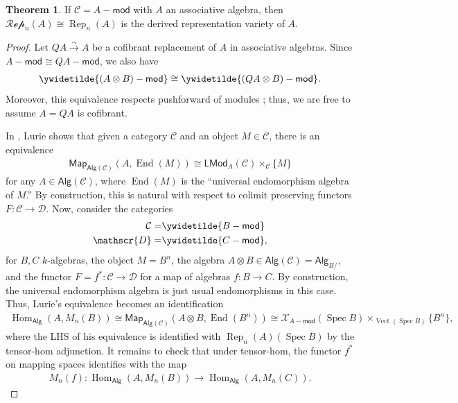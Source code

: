 \documentclass{article}
\numberwithin{equation}{section}
\theoremstyle{quest}
\theoremstyle{definition}
\newtheorem{thm}{Theorem}[section]
\theoremstyle{remark}
\newcommand{\msf}{\mathsf}
\newcommand{\Mod}{-\msf{mod}}
\DeclareMathOperator{\Hom}{Hom}
\DeclareMathOperator{\Spec}{Spec}
\DeclareMathOperator{\End}{End}
\DeclareMathOperator{\Rep}{Rep}
\DeclareMathOperator{\Vect}{Vect}
\begin{document}
\begin{thm}\label{thm:rep-on-affines}
	If $\mathcal{C}=A\Mod$ with $A$ an associative algebra, then $\mathscr{Rep}_n(A)\cong\Rep_n(A)$ is the derived representation variety of $A$.
\end{thm} 
\begin{proof}
	Let $QA\xrightarrow{\sim }A$ be a cofibrant replacement of $A$ in associative algebras. Since $A\Mod\cong QA\Mod$, we also have
	\begin{align*}
		\ywidetilde{(A\otimes B)\Mod}\cong\ywidetilde{(QA\otimes B)\Mod}.	
	\end{align*} 
	Moreover, this equivalence respects pushforward of modules \cite[Theorem 3.3.1]{Hin97}; thus, we are free to assume $A=QA$ is cofibrant.

	In \cite[\S4.7.1]{HA}, Lurie shows that given a category $\mathcal{C}$ and an object $M\in \mathcal{C}$, there is an equivalence
	\begin{align*}
		\mathsf{Map}_{\mathsf{Alg}(\mathcal{C})}(A,\End(M))\cong \mathsf{LMod}_A(\mathcal{C})\times _{\mathcal{C}} \{M\} 
	\end{align*} 
	for any $A\in \mathsf{Alg}(\mathcal{C})$, where $\End(M)$ is the ``universal endomorphism algebra of $M$.'' By construction, this is natural with respect to colimit preserving functors $F: \mathcal{C}\to \mathscr{D}$. Now, consider the categories 
	\begin{align*}
		\mathcal{C}=&\ywidetilde{ B\Mod}\\
		\mathscr{D}=&\ywidetilde{C\Mod}	,
	\end{align*} 
	for $B,C$ $k$-algebras,	the object $M=B^n$, the algebra $A\otimes B\in \mathsf{Alg}(\mathcal{C})=\mathsf{Alg}_{B /}$, and the functor $F=f^*: \mathcal{C}\to \mathscr{D}$ for a map of algebras $f:B\to C$. By construction, the universal endomorphism algebra is just usual endomorphisms in this case. Thus, Lurie's equivalence becomes an  identification
	\begin{align*}
		\Hom_{\mathsf{Alg}}(A,M_n(B))\cong \mathsf{Map}_{\mathsf{Alg}(\mathcal{C})}(A\otimes B,\End(B^n))\cong \mathcal{X}_{A\Mod}(\Spec B)\times _{\Vect(\Spec B)}\{B^n\} ,
	\end{align*} 
	where the LHS of his equivalence is identified with $\Rep_n(A)(\Spec B)$ by the tensor-hom adjunction. It remains to check that under tensor-hom, the functor $f^*$ on mapping spaces identifies with the map 
	\begin{align*}
		M_n(f):\Hom_{\mathsf{Alg}}(A,M_n(B))\to \Hom_{\mathsf{Alg}}(A,M_n(C)).

\end{align*}
\end{proof}
\end{document}
